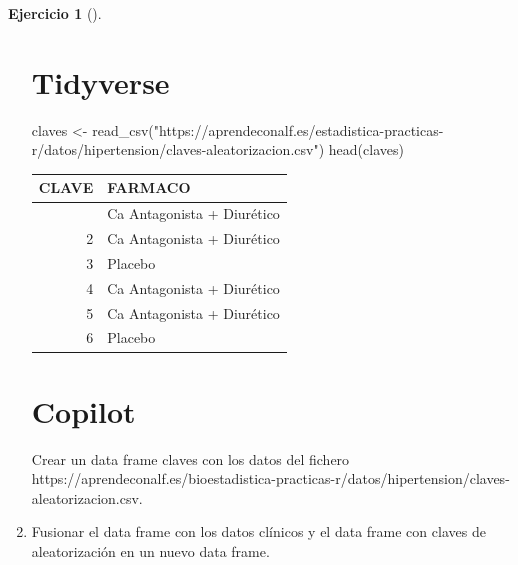 \documentclass[
  a4paper,
]{scrreport}
\newenvironment{Shaded}{\begin{snugshade}}{\end{snugshade}}
\newcommand{\ExtensionTok}[1]{\textcolor[rgb]{0.00,0.23,0.31}{#1}}
\newcommand{\FunctionTok}[1]{\textcolor[rgb]{0.28,0.35,0.67}{#1}}
\newcommand{\NormalTok}[1]{\textcolor[rgb]{0.00,0.23,0.31}{#1}}
\newcommand{\OtherTok}[1]{\textcolor[rgb]{0.00,0.23,0.31}{#1}}
\newcommand{\StringTok}[1]{\textcolor[rgb]{0.13,0.47,0.30}{#1}}
\theoremstyle{definition}
\newtheorem{exercise}{Ejercicio}[chapter]
\theoremstyle{remark}
\begin{document}
\begin{exercise}[]
\begin{enumerate}
\begin{tcolorbox}
  \section{Tidyverse}

\begin{Shaded}
\begin{Highlighting}[]
\NormalTok{claves }\OtherTok{\textless{}{-}} \FunctionTok{read\_csv}\NormalTok{(}\StringTok{"https://aprendeconalf.es/estadistica{-}practicas{-}r/datos/hipertension/claves{-}aleatorizacion.csv"}\NormalTok{)}
\FunctionTok{head}\NormalTok{(claves)}
\end{Highlighting}
\end{Shaded}

  \begin{longtable}[]{@{}rl@{}}
  \toprule\noalign{}
  CLAVE & FARMACO \\
  \midrule\noalign{}
  \endhead
  \bottomrule\noalign{}
  \endlastfoot
  1 & Ca Antagonista + Diurético \\
  2 & Ca Antagonista + Diurético \\
  3 & Placebo \\
  4 & Ca Antagonista + Diurético \\
  5 & Ca Antagonista + Diurético \\
  6 & Placebo \\
  \end{longtable}

  \section{Copilot}

\begin{Shaded}
\begin{Highlighting}[]
\ExtensionTok{Crear}\NormalTok{ un data frame claves con los datos del fichero https://aprendeconalf.es/bioestadistica{-}practicas{-}r/datos/hipertension/claves{-}aleatorizacion.csv.}
\end{Highlighting}
\end{Shaded}

  \end{tcolorbox}
\item
  Fusionar el data frame con los datos clínicos y el data frame con
  claves de aleatorización en un nuevo data frame.

  \begin{tcolorbox}[enhanced jigsaw, colframe=quarto-callout-tip-color-frame, toprule=.15mm, bottomtitle=1mm, breakable, opacitybacktitle=0.6, toptitle=1mm, colback=white, bottomrule=.15mm, title=\textcolor{quarto-callout-tip-color}{\faLightbulb}\hspace{0.5em}{Solución}, arc=.35mm, left=2mm, titlerule=0mm, rightrule=.15mm, coltitle=black, leftrule=.75mm, opacityback=0, colbacktitle=quarto-callout-tip-color!10!white]


\end{tcolorbox}
\end{enumerate}
\end{exercise}
\end{document}
